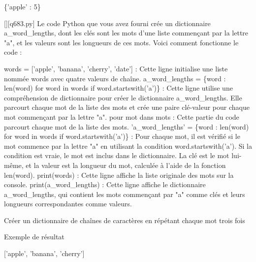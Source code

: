 \{'apple' : 5\}
        \par
        \begin{solution}
            \renewcommand{\nomfichier}{q683.py}
            \pythonfile{\chemincode \nomfichier}[][\nomfichier]
            Le code Python que vous avez fourni crée un dictionnaire a\_word\_lengths, dont les clés sont les mots d'une liste commençant par la lettre "a", et les valeurs sont les longueurs de ces mots. Voici comment fonctionne le code :

    words = ['apple', 'banana', 'cherry', 'date'] : Cette ligne initialise une liste nommée words avec quatre valeurs de chaîne.
    a\_word\_lengths = \{word : len(word) for word in words if word.startswith('a')\} : Cette ligne utilise une compréhension de dictionnaire pour créer le dictionnaire a\_word\_lengths. Elle parcourt chaque mot de la liste des mots et crée une paire clé-valeur pour chaque mot commençant par la lettre "a".
        pour mot dans mots : Cette partie du code parcourt chaque mot de la liste des mots.
        'a\_word\_lengths' = \{word : len(word) for word in words if word.startswith('a')\} : Pour chaque mot, il est vérifié si le mot commence par la lettre "a" en utilisant la condition word.startswith('a'). Si la condition est vraie, le mot est inclus dans le dictionnaire. La clé est le mot lui-même, et la valeur est la longueur du mot, calculée à l'aide de la fonction len(word).
    print(words) : Cette ligne affiche la liste originale des mots sur la console.
    print(a\_word\_lengths) : Cette ligne affiche le dictionnaire a\_word\_lengths, qui contient les mots commençant par "a" comme clés et leurs longueurs correspondantes comme valeurs.
        \end{solution}
        

        \question
        Créer un dictionnaire de chaînes de caractères en répétant chaque mot trois fois

Exemple de résultat

['apple', 'banana', 'cherry']

